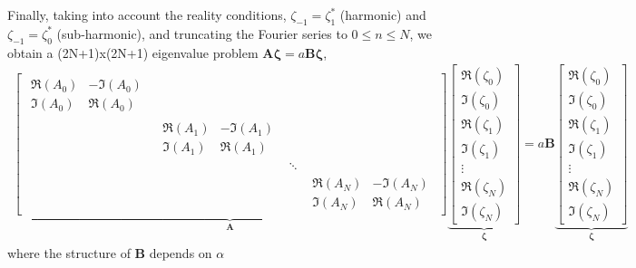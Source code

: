 \documentclass[prfluids]{revtex4-2}
\begin{document}
Finally, taking into account the reality conditions, $\zeta_{-1}=\zeta_{1}^*$
(harmonic) and $\zeta_{-1}=\zeta_{0}^*$ (sub-harmonic), and truncating the
Fourier series to $0 \leq n \leq N$, we obtain a (2N+1)x(2N+1) eigenvalue
problem $\textbf{A}\boldsymbol{\zeta}=a\mathbf{B}\boldsymbol{\zeta}$,
\begin{eqnarray}
  \underbrace{\left[\begin{matrix}
    \begin{matrix}
    \Re(A_0) & -\Im(A_0) \\
    \Im(A_0) &  \Re(A_0)
    \end{matrix}
    \\&
    \begin{matrix}
      \Re(A_1) & -\Im(A_1) \\
      \Im(A_1) &  \Re(A_1)
    \end{matrix}
    \\&&
    \ddots
    \\&&&
    \begin{matrix}
      \Re(A_N) & -\Im(A_N) \\
      \Im(A_N) &  \Re(A_N)
    \end{matrix}
  \end{matrix}\right]}_{\textbf{A}}
  \underbrace{
  \left[\begin{matrix}
    \Re(\zeta_0) \\ \Im(\zeta_0) \\
    \Re(\zeta_1) \\ \Im(\zeta_1) \\ \vdots \\
    \Re(\zeta_N) \\ \Im(\zeta_N)
  \end{matrix}\right]
  }_{\boldsymbol{\zeta}}
   = a\textbf{B}
   \underbrace{
  \left[\begin{matrix}
    \Re(\zeta_0) \\ \Im(\zeta_0) \\
    \Re(\zeta_1) \\ \Im(\zeta_1) \\ \vdots \\
    \Re(\zeta_N) \\ \Im(\zeta_N)
  \end{matrix}\right]
  }_{\boldsymbol{\zeta}}
\end{eqnarray}
where the structure of $\textbf{B}$ depends on $\alpha$
\end{document}
